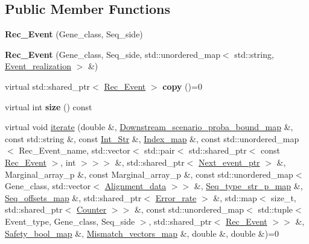 \subsection*{Public Member Functions}
\begin{DoxyCompactItemize}
\item 
\mbox{\label{classRec__Event_a60eeeab16f772a796612ff3a74953b86}} 
{\bfseries Rec\+\_\+\+Event} (Gene\+\_\+class, Seq\+\_\+side)
\item 
\mbox{\label{classRec__Event_a13358de891bf06f564ed8848a364fffd}} 
{\bfseries Rec\+\_\+\+Event} (Gene\+\_\+class, Seq\+\_\+side, std\+::unordered\+\_\+map$<$ std\+::string, \hyperlink{structEvent__realization}{Event\+\_\+realization} $>$ \&)
\item 
\mbox{\label{classRec__Event_ad4726690ef39967d2e2996f84d452f80}} 
virtual std\+::shared\+\_\+ptr$<$ \hyperlink{classRec__Event}{Rec\+\_\+\+Event} $>$ {\bfseries copy} ()=0
\item 
\mbox{\label{classRec__Event_a6786fc194b49fd7fd66a041f523b5fd8}} 
virtual int {\bfseries size} () const
\item 
virtual void \hyperlink{classRec__Event_a0fea607ec06bdd1a7f5ebb04a96e5253}{iterate} (double \&, \hyperlink{classEnum__fast__memory__map}{Downstream\+\_\+scenario\+\_\+proba\+\_\+bound\+\_\+map} \&, const std\+::string \&, const \hyperlink{classInt__Str}{Int\+\_\+\+Str} \&, \hyperlink{classEnum__fast__memory__map}{Index\+\_\+map} \&, const std\+::unordered\+\_\+map$<$ Rec\+\_\+\+Event\+\_\+name, std\+::vector$<$ std\+::pair$<$ std\+::shared\+\_\+ptr$<$ const \hyperlink{classRec__Event}{Rec\+\_\+\+Event} $>$, int $>$$>$$>$ \&, std\+::shared\+\_\+ptr$<$ \hyperlink{classRec__Event}{Next\+\_\+event\+\_\+ptr} $>$ \&, Marginal\+\_\+array\+\_\+p \&, const Marginal\+\_\+array\+\_\+p \&, const std\+::unordered\+\_\+map$<$ Gene\+\_\+class, std\+::vector$<$ \hyperlink{structAlignment__data}{Alignment\+\_\+data} $>$$>$ \&, \hyperlink{classEnum__fast__memory__map}{Seq\+\_\+type\+\_\+str\+\_\+p\+\_\+map} \&, \hyperlink{classEnum__fast__memory__dual__key__map}{Seq\+\_\+offsets\+\_\+map} \&, std\+::shared\+\_\+ptr$<$ \hyperlink{classError__rate}{Error\+\_\+rate} $>$ \&, std\+::map$<$ size\+\_\+t, std\+::shared\+\_\+ptr$<$ \hyperlink{classCounter}{Counter} $>$$>$ \&, const std\+::unordered\+\_\+map$<$ std\+::tuple$<$ Event\+\_\+type, Gene\+\_\+class, Seq\+\_\+side $>$, std\+::shared\+\_\+ptr$<$ \hyperlink{classRec__Event}{Rec\+\_\+\+Event} $>$$>$ \&, \hyperlink{classEnum__fast__memory__map}{Safety\+\_\+bool\+\_\+map} \&, \hyperlink{classEnum__fast__memory__map}{Mismatch\+\_\+vectors\+\_\+map} \&, double \&, double \&)=0
$$
\end{DoxyCompactItemize}
